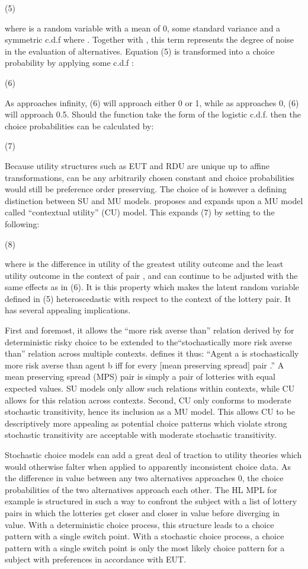 		(5)

where  is a random variable with a mean of 0, some standard variance and a symmetric c.d.f  where .
Together with , this term represents the degree of noise in the evaluation of alternatives.
Equation (5) is transformed into a choice probability by applying some c.d.f :

		(6)

As  approaches infinity, (6) will approach either 0 or 1, while as  approaches 0, (6) will approach 0.5.
Should the function  take the form of the logistic c.d.f. then the choice probabilities can be calculated by:

		(7)

Because utility structures such as EUT and RDU are unique up to affine transformations,  can be any arbitrarily chosen constant and choice probabilities would still be preference order preserving.
The choice of  is however a defining distinction between SU and MU models.
\textcite{Wilcox2008} proposes and \textcite{Wilcox2011} expands upon a MU model called \enquote{contextual utility} (CU) model. This expands (7) by setting  to the following:

		(8)

where  is the difference in utility of the greatest utility outcome and the least utility outcome in the context of pair , and  can continue to be adjusted with the same effects as  in (6).
It is this property which makes the latent random variable defined in (5) heteroscedastic with respect to the context of the lottery pair.
It has several appealing implications.


First and foremost, it allows the \enquote{more risk averse than} relation derived by \textcite{Pratt1964} for deterministic risky choice to be extended to the\enquote{stochastically more risk averse than} relation across multiple contexts.
\textcite[89]{Wilcox2011} defines it thus: \enquote{Agent a is stochastically more risk averse than agent b \textelp{} iff  for every [mean preserving spread] pair .}
A mean preserving spread (MPS) pair is simply a pair of lotteries with equal expected values.
SU models only allow such relations within contexts, while CU allows for this relation across contexts.
Second, CU only conforms to moderate stochastic transitivity, hence its inclusion as a MU model.
This allows CU to be descriptively more appealing as potential choice patterns which violate strong stochastic transitivity are acceptable with moderate stochastic transitivity.

Stochastic choice models can add a great deal of traction to utility theories which would otherwise falter when applied to apparently inconsistent choice data.
As the difference in value between any two alternatives approaches 0, the choice probabilities of the two alternatives approach each other.
The HL MPL for example is structured in such a way to confront the subject with a list of lottery pairs in which the lotteries get closer and closer in value before diverging in value.
With a deterministic choice process, this structure leads to a choice pattern with a single switch point.
With a stochastic choice process, a choice pattern with a single switch point is only the most likely choice pattern for a subject with preferences in accordance with EUT. 

